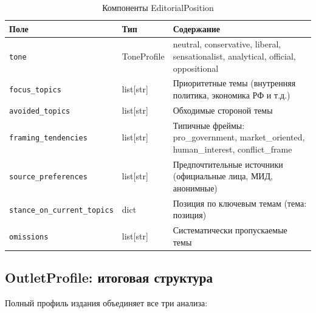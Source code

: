 \begin{table}[h!]
\centering
\caption{Компоненты EditorialPosition}
\label{tab:editorial_position}
\footnotesize
\begin{tabular}{|l|l|l|}
\hline
\textbf{Поле} & \textbf{Тип} & \textbf{Содержание} \\
\hline
\texttt{tone} & ToneProfile & neutral, conservative, liberal, sensationalist, analytical, official, oppositional \\
\texttt{focus\_topics} & list[str] & Приоритетные темы (внутренняя политика, экономика РФ и т.д.) \\
\texttt{avoided\_topics} & list[str] & Обходимые стороной темы \\
\texttt{framing\_tendencies} & list[str] & Типичные фреймы: pro\_government, market\_oriented, human\_interest, conflict\_frame \\
\texttt{source\_preferences} & list[str] & Предпочтительные источники (официальные лица, МИД, анонимные) \\
\texttt{stance\_on\_current\_topics} & dict & Позиция по ключевым темам (тема: позиция) \\
\texttt{omissions} & list[str] & Систематически пропускаемые темы \\
\hline
\end{tabular}
\end{table}


\subsection{OutletProfile: итоговая структура}

Полный профиль издания объединяет все три анализа:

